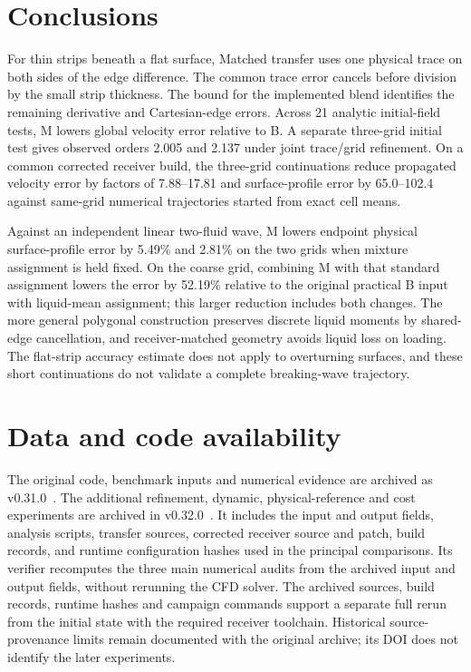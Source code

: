 \documentclass[10pt]{article}
\begin{document}
\section{Conclusions}
For thin strips beneath a flat surface, Matched transfer uses one physical
trace on both sides of the edge difference. The common trace error cancels
before division by the small strip thickness. The bound for the implemented
blend identifies the remaining derivative and Cartesian-edge errors.
Across 21 analytic initial-field tests, M lowers global velocity error
relative to B. A separate three-grid initial test gives observed orders
2.005 and 2.137 under joint trace/grid refinement. On a common corrected
receiver build, the three-grid continuations reduce propagated velocity
error by factors of 7.88--17.81 and surface-profile error by 65.0--102.4
against same-grid numerical trajectories started from exact cell means.

Against an independent linear two-fluid wave, M lowers endpoint physical
surface-profile error by 5.49\% and 2.81\% on the two grids when mixture
assignment is held fixed. On the coarse grid, combining M with that
standard assignment lowers the error by 52.19\% relative to the original
practical B input with liquid-mean assignment;
this larger reduction includes both changes. The more general polygonal
construction preserves discrete liquid moments by shared-edge cancellation,
and receiver-matched geometry avoids liquid loss on loading. The flat-strip
accuracy estimate does not apply to overturning surfaces, and these short
continuations do not validate a complete breaking-wave trajectory.

\section*{Data and code availability}\label{sec:data-code}
The original code, benchmark inputs and numerical evidence are archived
as v0.31.0~\citep{baturin-transfer}. The additional refinement, dynamic,
physical-reference and cost experiments are archived in
v0.32.0~\citep{baturin-followup}. It includes the input and output fields,
analysis scripts, transfer sources, corrected receiver source and patch,
build records, and runtime configuration hashes used in the principal
comparisons. Its verifier recomputes the three main numerical audits from
the archived input and output fields, without rerunning the CFD solver.
The archived sources, build records, runtime hashes and campaign commands
support a separate full rerun from the initial state with the required
receiver toolchain. Historical source-provenance limits remain documented
with the original archive; its DOI does not identify the later experiments.
\end{document}
